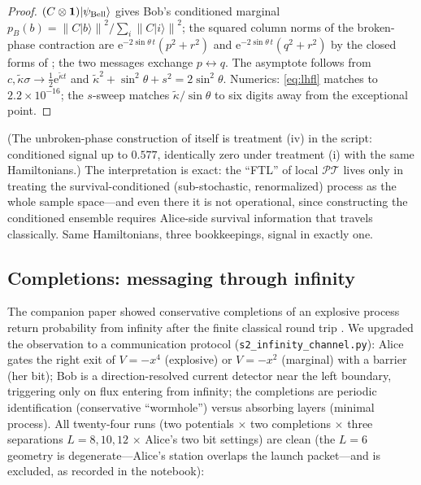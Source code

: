 \documentclass[11pt]{article}
\theoremstyle{definition}
\theoremstyle{remark}
\newcommand{\PT}{\mathcal{PT}}
\newcommand{\ee}{\mathrm{e}}
\newcommand{\norm}[1]{\left\lVert #1 \right\rVert}
\newcommand{\ket}[1]{|#1\rangle}
\begin{document}
\begin{proof}
$(C\otimes\mathbf 1)\ket{\psi_{\rm Bell}}$ gives Bob's conditioned
marginal $p_B(b)=\norm{C\ket b}^{2}/\sum_i\norm{C\ket i}^{2}$; the
squared column norms of the broken-phase contraction are
$\ee^{-2\sin\theta\,t}(p^{2}+r^{2})$ and
$\ee^{-2\sin\theta\,t}(q^{2}+r^{2})$ by the closed forms of
\cite{indivisible}; the two messages exchange $p\leftrightarrow q$.
The asymptote follows from $c,\tilde\kappa\sigma\to
\tfrac12\ee^{\tilde\kappa t}$ and
$\tilde\kappa^{2}+\sin^{2}\theta+s^{2}=2\sin^{2}\theta$.
Numerics: \eqref{eq:lhfl} matches to $2.2\times10^{-16}$; the
$s$-sweep matches $\tilde\kappa/\sin\theta$ to six digits away from
the exceptional point.
\end{proof}

(The unbroken-phase construction of \cite{LHFL2014} itself is
treatment (iv) in the script: conditioned signal up to $0.577$,
identically zero under treatment (i) with the same Hamiltonians.)
The interpretation is exact: the ``FTL'' of local $\PT$ lives only in
treating the survival-conditioned (sub-stochastic, renormalized)
process as the whole sample space---and even there it is not
operational, since constructing the conditioned ensemble requires
Alice-side survival information that travels classically. Same
Hamiltonians, three bookkeepings, signal in exactly one.

\subsection{Completions: messaging through infinity}

The companion paper showed conservative completions of an explosive
process return probability from infinity after the finite classical
round trip \cite{indivisible}. We upgraded the observation to a
communication protocol (\texttt{s2\_infinity\_channel.py}): Alice
gates the right exit of $V=-x^{4}$ (explosive) or $V=-x^{2}$
(marginal) with a barrier (her bit); Bob is a direction-resolved
current detector near the left boundary, triggering only on flux
entering from infinity; the completions are periodic identification
(conservative ``wormhole'') versus absorbing layers (minimal
process). All twenty-four runs (two potentials $\times$ two completions $\times$ three separations $L=8,10,12$ $\times$ Alice's two bit settings) are clean
(the $L=6$ geometry is degenerate---Alice's station overlaps the
launch packet---and is excluded, as recorded in the notebook):
\end{document}
